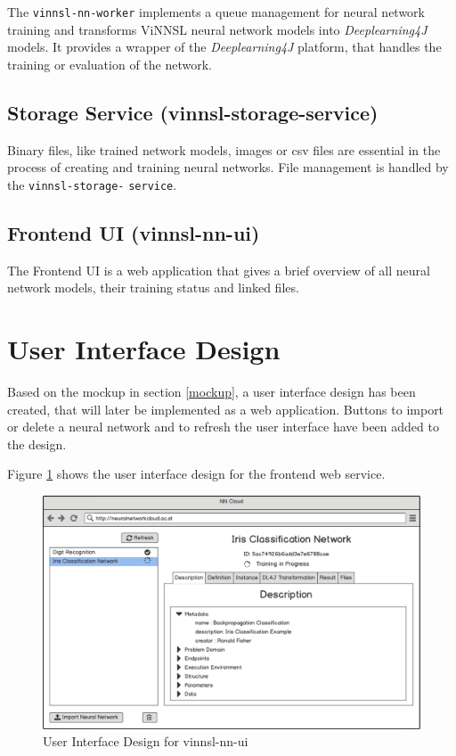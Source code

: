 The \texttt{vinnsl-nn-worker} implements a queue management for neural
network training and transforms ViNNSL neural network models into
\emph{Deeplearning4J} models. It provides a wrapper of the
\emph{Deeplearning4J} platform, that handles the training or evaluation
of the network.

\subsection{Storage Service
(vinnsl-storage-service)}\label{storage-service-vinnsl-storage-service}

Binary files, like trained network models, images or csv files are
essential in the process of creating and training neural networks. File
management is handled by the \texttt{vinnsl-storage-} \texttt{service}.

\subsection{Frontend UI (vinnsl-nn-ui)}\label{frontend-ui-vinnsl-nn-ui}

The Frontend UI is a web application that gives a brief overview of all
neural network models, their training status and linked files.

\section{User Interface Design}\label{user-interface-design}

Based on the mockup in section \ref{mockup}, a user interface design has
been created, that will later be implemented as a web application.
Buttons to import or delete a neural network and to refresh the user
interface have been added to the design.

Figure \ref{vinnsl-ui-design} shows the user interface design for the
frontend web service.

\begin{figure}
\centering
\includegraphics[width=17.00000cm]{images/vinnsl-ui-design}
\caption{User Interface Design for vinnsl-nn-ui
\label{vinnsl-ui-design}}
\end{figure}

